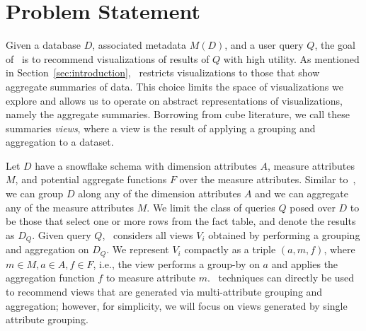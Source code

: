 

\section{Problem Statement}
\label{sec:problem_statement}

Given a database $D$, associated metadata $M(D)$, and a user query $Q$, the goal
of \SeeDB\ is to recommend visualizations of results of $Q$ with high utility. 
As mentioned in Section~\ref{sec:introduction}, \SeeDB\ restricts visualizations to
those that show aggregate summaries of data.
This choice limits the space of visualizations we explore and allows us to operate
on abstract representations of visualizations, namely the aggregate summaries.
Borrowing from cube literature, we call these summaries {\it views}, where a view
is the result of applying a grouping and aggregation to a dataset.

Let $D$ have a snowflake schema with 
dimension attributes $A$, measure attributes $M$, and potential
aggregate functions $F$ over the measure attributes. 
Similar to~\cite{}, we can group $D$ along any of the dimension attributes $A$ 
and we can aggregate any of the measure attributes $M$.
We limit the class of queries $Q$ posed over $D$ to be
those that select one or more rows from the fact table, and denote the results
as $D_Q$. 
Given query $Q$, \SeeDB\ considers all views $V_i$ obtained by performing a 
grouping and aggregation on $D_Q$. 
We represent $V_i$ compactly as a triple $(a, m, f)$, where $m \in M, a \in A, f \in F$, 
i.e., the view performs a group-by on $a$ and applies the aggregation function $f$ to measure
attribute $m$. 
\SeeDB\ techniques can directly be used to recommend views that are
generated via multi-attribute grouping and aggregation; however,
for simplicity, we will focus on views generated by single attribute grouping. 



